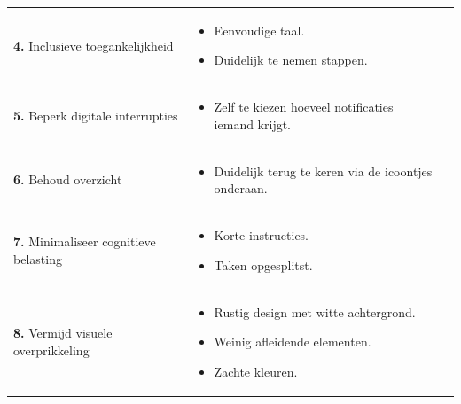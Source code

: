 {\begin{longtable}{
            >{\raggedright\arraybackslash}p{5.23cm}
            >{\raggedright\arraybackslash}p{4.93cm}
            >{\raggedright\arraybackslash}p{4.93cm}
        }
        \addlinespace[5pt]
        
        \textbf{4.} Inclusieve toegankelijkheid 
        &  
        \begin{itemize}[nosep,leftmargin=*,itemsep=10pt] 
            \renewcommand{\labelitemi}{+} 
            \item Eenvoudige taal.
            \item Duidelijk te nemen stappen.
        \end{itemize} 
        &
        \\
        
        \addlinespace[5pt]
        
        \textbf{5.} Beperk digitale interrupties
        & 
        \begin{itemize}[nosep,leftmargin=*,itemsep=10pt]
            \renewcommand{\labelitemi}{+}
            \item Zelf te kiezen hoeveel notificaties iemand krijgt.
        \end{itemize}
        &
        \\
        
        \addlinespace[5pt]
        
        \textbf{6.} Behoud overzicht
        &  
        \begin{itemize}[nosep,leftmargin=*,itemsep=10pt] 
            \renewcommand{\labelitemi}{+} 
            \item Duidelijk terug te keren via de icoontjes onderaan.
        \end{itemize} 
        &
        \\ 
        
        \addlinespace[5pt]
        
        \textbf{7.} Minimaliseer cognitieve belasting
        &  
        \begin{itemize}[nosep,leftmargin=*,itemsep=10pt] 
            \renewcommand{\labelitemi}{+} 
            \item Korte instructies.
            \item Taken opgesplitst.
        \end{itemize} 
        &
        \\ 
        
        \addlinespace[5pt]
        
        \textbf{8.} Vermijd visuele overprikkeling 
        &  
        \begin{itemize}[nosep,leftmargin=*,itemsep=10pt] 
            \renewcommand{\labelitemi}{+} 
            \item Rustig design met witte achtergrond.
            \item Weinig afleidende elementen.
            \item Zachte kleuren.
        \end{itemize} 
        &
        \\
        

\end{longtable}}
